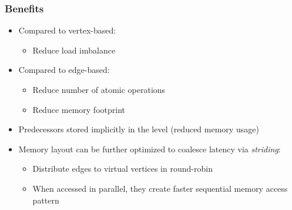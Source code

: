 \begin{frame}
  \frametitle{Benefits}

  \begin{itemize}
    \item Compared to vertex-based:
      \begin{itemize}
        \item Reduce load imbalance
      \end{itemize}
    \item Compared to edge-based:
      \begin{itemize}
        \item Reduce number of atomic operations
        \item Reduce memory footprint
      \end{itemize}
    \item Predecessors stored implicitly in the \spdag level (reduced memory usage)
    \item Memory layout can be further optimized to coalesce latency via \emph{striding}:
      \begin{itemize}
        \item Distribute edges to virtual vertices in round-robin
        \item When accessed in parallel, they create faster sequential memory access pattern
      \end{itemize}
  \end{itemize}
\end{frame}


